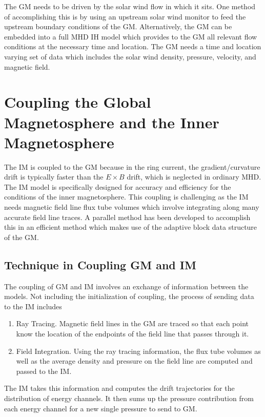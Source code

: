 The GM needs to be driven by the solar wind flow in which it sits.  One
method of accomplishing this is by using an upstream solar wind monitor
to feed the upstream boundary conditions of the GM.  Alternatively, the
GM can be embedded into a full MHD IH model which provides to the GM
all relevant flow conditions at the necessary time and location.  The
GM needs a time and location varying set of data which includes the
solar wind density, pressure, velocity, and magnetic field.

\section{Coupling the Global Magnetosphere and the Inner Magnetosphere}

The IM is coupled to the GM because in the ring current, the
gradient/curvature drift is typically faster than the $E \times B$
drift, which is neglected in ordinary MHD.  The IM model is
specifically designed for accuracy and efficiency for the conditions of
the inner magnetosphere.  This coupling is challenging as the IM needs
magnetic field line flux tube volumes which involve integrating along
many accurate field line traces.  A parallel method has been developed
to accomplish this in an efficient method which makes use of the
adaptive block data structure of the GM.

\subsection{Technique in Coupling GM and IM}

The coupling of GM and IM involves an exchange of information between
the models.  Not including the initialization of coupling, the process
of sending data to the IM includes
\begin{enumerate}
\item Ray Tracing.  Magnetic field lines in the GM are traced so that
  each point know the location of the endpoints of the field line that
  passes through it.
\item Field Integration.  Using the ray tracing information, the flux
  tube volumes as well as the average density and pressure on the field
  line are computed and passed to the IM.
\end{enumerate}

The IM takes this information and computes the drift trajectories for
the distribution of energy channels.  It then sums up the pressure
contribution from each energy channel for a new single pressure to send
to GM.


